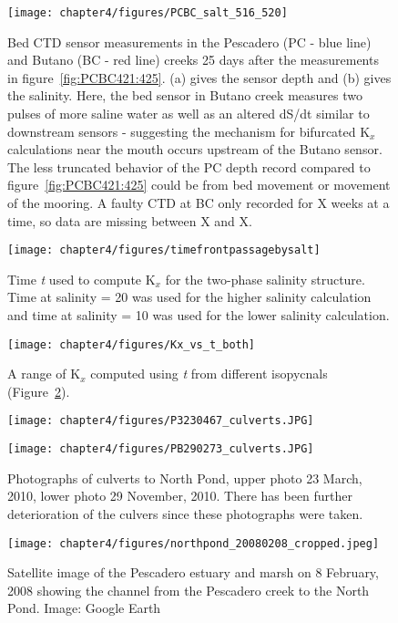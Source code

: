 \begin{figure}
	\texttt{[image: chapter4/figures/PCBC\_salt\_516\_520]}
	\caption{Bed CTD sensor measurements in the Pescadero (PC - blue line) and Butano (BC - red line) creeks 25 days after the measurements in figure~\ref{fig:PCBC421:425}. (a) gives the sensor depth and (b) gives the salinity. Here, the bed sensor in Butano creek measures two pulses of more saline water as well as an altered dS/dt similar to downstream sensors - suggesting the mechanism for bifurcated K$_x$ calculations near the mouth occurs upstream of the Butano sensor. The less truncated behavior of the PC depth record compared to figure~\ref{fig:PCBC421:425} could be from bed movement or movement of the mooring. A faulty CTD at BC only recorded for X weeks at a time, so data are missing between X and X.}  \label{fig:PCBC511:516}
\end{figure}


\begin{figure}
	\texttt{[image: chapter4/figures/timefrontpassagebysalt]}
	\caption{Time \emph{t} used to compute K$_x$ for the two-phase salinity structure. Time at salinity = 20 was used for the higher salinity calculation and time at salinity = 10 was used for the lower salinity calculation.}  \label{fig:tvsS}
\end{figure}



\begin{figure}
	\texttt{[image: chapter4/figures/Kx\_vs\_t\_both]}
	\caption{A range of K$_x$ computed using \emph{t} from different isopycnals (Figure~\ref{fig:tvsS}).}  \label{fig:Kxvst}
\end{figure}



\begin{figure}
\centering
	\texttt{[image: chapter4/figures/P3230467\_culverts.JPG]}

	\texttt{[image: chapter4/figures/PB290273\_culverts.JPG]}

\caption{Photographs of culverts to North Pond, upper photo 23 March, 2010, lower photo 29 November, 2010. There has been further deterioration of the culvers since these photographs were taken.} \label{fig:photoCulverts}
\end{figure}





\begin{figure}
\centering
	\texttt{[image: chapter4/figures/northpond\_20080208\_cropped.jpeg]}
	\caption{Satellite image of the Pescadero estuary and marsh on 8 February, 2008 showing the channel from the Pescadero creek to the North Pond. Image: Google Earth} \label{fig:geNP}
\end{figure}


